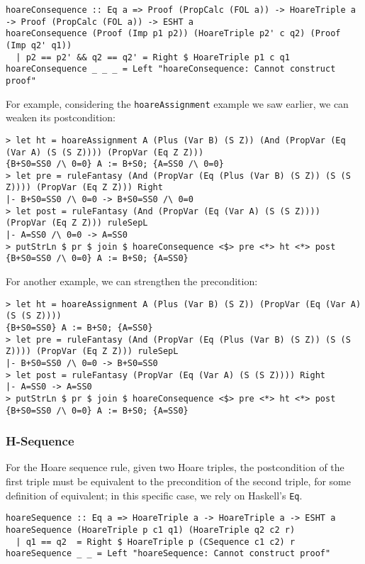 \documentclass{article}
\begin{document}
\begin{lstlisting}
hoareConsequence :: Eq a => Proof (PropCalc (FOL a)) -> HoareTriple a -> Proof (PropCalc (FOL a)) -> ESHT a
hoareConsequence (Proof (Imp p1 p2)) (HoareTriple p2' c q2) (Proof (Imp q2' q1))
  | p2 == p2' && q2 == q2' = Right $ HoareTriple p1 c q1
hoareConsequence _ _ _ = Left "hoareConsequence: Cannot construct proof"
\end{lstlisting}

For example, considering the \texttt{hoareAssignment} example we saw earlier, we can weaken its postcondition:

\begin{lstlisting}
> let ht = hoareAssignment A (Plus (Var B) (S Z)) (And (PropVar (Eq (Var A) (S (S Z)))) (PropVar (Eq Z Z)))
{B+S0=SS0 /\ 0=0} A := B+S0; {A=SS0 /\ 0=0}
> let pre = ruleFantasy (And (PropVar (Eq (Plus (Var B) (S Z)) (S (S Z)))) (PropVar (Eq Z Z))) Right
|- B+S0=SS0 /\ 0=0 -> B+S0=SS0 /\ 0=0
> let post = ruleFantasy (And (PropVar (Eq (Var A) (S (S Z)))) (PropVar (Eq Z Z))) ruleSepL
|- A=SS0 /\ 0=0 -> A=SS0
> putStrLn $ pr $ join $ hoareConsequence <$> pre <*> ht <*> post
{B+S0=SS0 /\ 0=0} A := B+S0; {A=SS0}
\end{lstlisting}

For another example, we can strengthen the precondition:

\begin{lstlisting}
> let ht = hoareAssignment A (Plus (Var B) (S Z)) (PropVar (Eq (Var A) (S (S Z))))
{B+S0=SS0} A := B+S0; {A=SS0}
> let pre = ruleFantasy (And (PropVar (Eq (Plus (Var B) (S Z)) (S (S Z)))) (PropVar (Eq Z Z))) ruleSepL
|- B+S0=SS0 /\ 0=0 -> B+S0=SS0
> let post = ruleFantasy (PropVar (Eq (Var A) (S (S Z)))) Right
|- A=SS0 -> A=SS0
> putStrLn $ pr $ join $ hoareConsequence <$> pre <*> ht <*> post
{B+S0=SS0 /\ 0=0} A := B+S0; {A=SS0}
\end{lstlisting}

\subsubsection{H-Sequence}

For the Hoare sequence rule, given two Hoare triples, the postcondition of the first triple must be equivalent to the precondition of the second triple, for some definition of equivalent; in this specific case, we rely on Haskell's \texttt{Eq}.

\begin{lstlisting}
hoareSequence :: Eq a => HoareTriple a -> HoareTriple a -> ESHT a
hoareSequence (HoareTriple p c1 q1) (HoareTriple q2 c2 r)
  | q1 == q2  = Right $ HoareTriple p (CSequence c1 c2) r
hoareSequence _ _ = Left "hoareSequence: Cannot construct proof"
\end{lstlisting}
\end{document}
